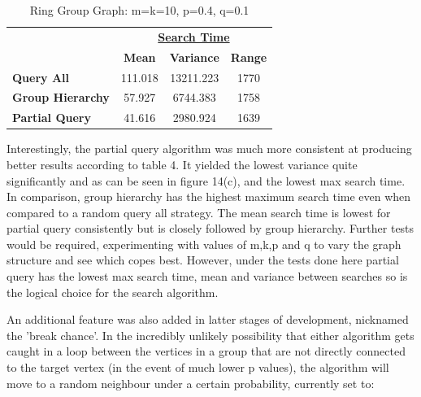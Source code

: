\documentclass[12pt,a4paper]{article}
\begin{document}
\begin{table}[h]
	\centering
	\begin{tabular}{lccc}
		& \multicolumn{3}{c}{{\ul \textbf{Search Time}}}                                                                    \\ \cline{2-4} 
		\multicolumn{1}{l|}{}                         & \multicolumn{1}{c|}{\textbf{Mean}} & \multicolumn{1}{c|}{\textbf{Variance}} & \multicolumn{1}{c|}{\textbf{Range}} \\ \hline
		\multicolumn{1}{|l|}{\textbf{Query All}}      & \multicolumn{1}{c|}{111.018}       & \multicolumn{1}{c|}{13211.223}         & \multicolumn{1}{c|}{1770}           \\ \hline
		\multicolumn{1}{|l|}{\textbf{Group Hierarchy}} & \multicolumn{1}{c|}{57.927}        & \multicolumn{1}{c|}{6744.383}          & \multicolumn{1}{c|}{1758}           \\ \hline
		\multicolumn{1}{|l|}{\textbf{Partial Query}}  & \multicolumn{1}{c|}{41.616}        & \multicolumn{1}{c|}{2980.924}          & \multicolumn{1}{c|}{1639}           \\ \hline
	\end{tabular}
	\caption{Ring Group Graph: m=k=10, p=0.4, q=0.1}
\end{table}

\newpage 
 
Interestingly, the partial query algorithm was much more consistent at producing better results according to table 4. It yielded the lowest variance quite significantly and as can be seen in figure 14(c), and the lowest max search time. In comparison, group hierarchy has the highest maximum search time even when compared to a random query all strategy. The mean search time is lowest for partial query consistently but is closely followed by group hierarchy. Further tests would be required, experimenting with values of m,k,p and q to vary the graph structure and see which copes best. However, under the tests done here partial query has the lowest max search time, mean and variance between searches so is the logical choice for the search algorithm.

An additional feature was also added in latter stages of development, nicknamed the 'break chance'. In the incredibly unlikely possibility that either algorithm gets caught in a loop between the vertices in a group that are not directly connected to the target vertex (in the event of much lower p values), the algorithm will move to a random neighbour under a certain probability, currently set to:
\end{document}
